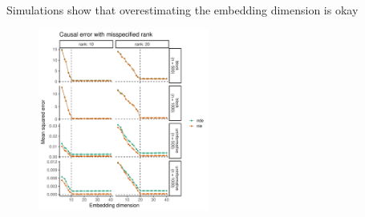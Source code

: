 \documentclass[aspectratio=169]{beamer}
\theoremstyle{remark}
\begin{document}
\begin{frame}{Simulations show that overestimating the embedding dimension is okay}
    \centering
    \begin{figure}
        \includegraphics[width=0.5\textwidth]{figures/misspecification/loss_average.pdf}
    \end{figure}
\end{frame}
\end{document}
